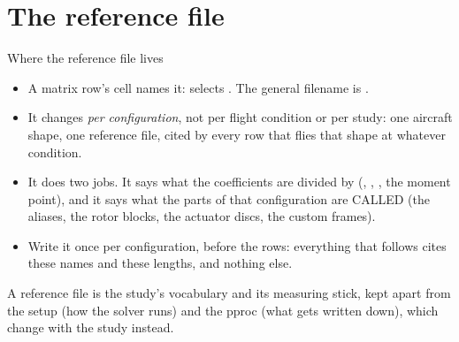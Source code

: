 %
\section{The reference file}

\begin{frame}{Where the reference file lives}
\begin{itemize}\small
  \item A matrix row's  cell names it:  selects
        . The general filename is
        .
  \item It changes \emph{per configuration}, not per flight condition or
        per study: one aircraft shape, one reference file, cited by every
        row that flies that shape at whatever condition.
  \item It does two jobs. It says what the coefficients are divided by
        (, , , the moment point), and it
        says what the parts of that configuration are CALLED (the aliases,
        the rotor blocks, the actuator discs, the custom frames).
  \item Write it once per configuration, before the rows: everything that
        follows cites these names and these lengths, and nothing else.
\end{itemize}
\begin{takeaway}
A reference file is the study's vocabulary and its measuring stick, kept
apart from the setup (how the solver runs) and the pproc (what gets
written down), which change with the study instead.
\end{takeaway}
\end{frame}

